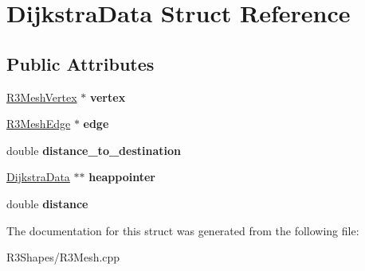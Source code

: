 \hypertarget{struct_dijkstra_data}{}\section{Dijkstra\+Data Struct Reference}
\label{struct_dijkstra_data}
\subsection*{Public Attributes}
\begin{DoxyCompactItemize}
\item 
\hyperlink{class_r3_mesh_vertex}{R3\+Mesh\+Vertex} $\ast$ {\bfseries vertex}\hypertarget{struct_dijkstra_data_a3116dd1e6db4f5862780898fca6fbf43}{}\label{struct_dijkstra_data_a3116dd1e6db4f5862780898fca6fbf43}

\item 
\hyperlink{class_r3_mesh_edge}{R3\+Mesh\+Edge} $\ast$ {\bfseries edge}\hypertarget{struct_dijkstra_data_a396383a1a1a474fa5c6ff585dce85c43}{}\label{struct_dijkstra_data_a396383a1a1a474fa5c6ff585dce85c43}

\item 
double {\bfseries distance\+\_\+to\+\_\+destination}\hypertarget{struct_dijkstra_data_a43721c59c2e591195493ad8e21cb6722}{}\label{struct_dijkstra_data_a43721c59c2e591195493ad8e21cb6722}

\item 
\hyperlink{struct_dijkstra_data}{Dijkstra\+Data} $\ast$$\ast$ {\bfseries heappointer}\hypertarget{struct_dijkstra_data_a905be747b7f605ffa5d17d3873a02cf0}{}\label{struct_dijkstra_data_a905be747b7f605ffa5d17d3873a02cf0}

\item 
double {\bfseries distance}\hypertarget{struct_dijkstra_data_a3dacd33f0e2c378b3ef6bb427e9dcbb5}{}\label{struct_dijkstra_data_a3dacd33f0e2c378b3ef6bb427e9dcbb5}

\end{DoxyCompactItemize}


The documentation for this struct was generated from the following file\+:\begin{DoxyCompactItemize}
\item 
R3\+Shapes/R3\+Mesh.\+cpp\end{DoxyCompactItemize}
